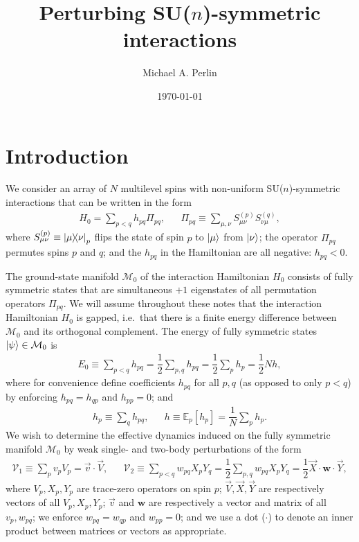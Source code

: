 \documentclass[nofootinbib,notitlepage,11pt]{revtex4-2}
\newcommand{\f}[2]{\dfrac{#1}{#2}} %
\renewcommand{\sp}[1]{\left[#1\right]} %
\renewcommand{\c}{\cdot} %
\newcommand{\m}{\bm} %
\renewcommand{\v}{\vec} %
\newcommand{\1}{\mathds{1}}
\newcommand{\M}{\mathcal{M}}
\newcommand{\V}{\mathcal{V}}
\newcommand{\EE}{\mathbb{E}}
\begin{document}
\title{Perturbing SU($n$)-symmetric interactions}%
\author{Michael A. Perlin}%
\date{\today}

\maketitle

\tableofcontents

\section{Introduction}

We consider an array of $N$ multilevel spins with non-uniform
SU($n$)-symmetric interactions that can be written in the form
\begin{align}
  H_0 = \sum_{p<q} h_{pq} \Pi_{pq},
  &&
  \Pi_{pq} \equiv \sum_{\mu,\nu} S_{\mu\nu}^{(p)} S_{\nu\mu}^{(q)},
  \label{eq:ints}
\end{align}
where $S_{\mu\nu}^{(p)}\equiv\op{\mu}{\nu}_p$ flips the state of spin
$p$ to $\ket\mu$ from $\ket\nu$; the operator $\Pi_{pq}$ permutes
spins $p$ and $q$; and the $h_{pq}$ in the Hamiltonian are all
negative: $h_{pq}<0$.

The ground-state manifold $\M_0$ of the interaction Hamiltonian $H_0$
consists of fully symmetric states that are simultaneous $+1$
eigenstates of all permutation operators $\Pi_{pq}$.  We will assume
throughout these notes that the interaction Hamiltonian $H_0$ is
gapped, i.e.~that there is a finite energy difference between $\M_0$
and its orthogonal complement.  The energy of fully symmetric states
$\ket\psi\in\M_0$ is
\begin{align}
  E_0 \equiv \sum_{p<q} h_{pq}
  = \f12 \sum_{p,q} h_{pq}
  = \f12 \sum_p h_p
  = \f12 N h,
\end{align}
where for convenience define coefficients $h_{pq}$ for all $p,q$ (as
opposed to only $p<q$) by enforcing $h_{pq}=h_{qp}$ and $h_{pp}=0$;
and
\begin{align}
  h_p \equiv \sum_q h_{pq},
  &&
  h \equiv \EE_p\sp{h_p} = \f1N \sum_p h_p.
\end{align}
We wish to determine the effective dynamics induced on the fully
symmetric manifold $\M_0$ by weak single- and two-body perturbations
of the form
\begin{align}
  \V_1 \equiv \sum_p v_p V_p = \v v\c\v V,
  &&
  \V_2 \equiv \sum_{p<q} w_{pq} X_p Y_q
  = \f12 \sum_{p,q} w_{pq} X_p Y_q
  = \f12 \v X \c\m w \c\v Y,
  \label{eq:perturbations}
\end{align}
where $V_p,X_p,Y_p$ are trace-zero operators on spin $p$;
$\v V,\v X,\v Y$ are respectively vectors of all $V_p,X_p,Y_p$; $\v v$
and $\m w$ are respectively a vector and matrix of all $v_p,w_{pq}$;
we enforce $w_{pq}=w_{qp}$ and $w_{pp}=0$; and we use a dot ($\c$) to
denote an inner product between matrices or vectors as appropriate.
\end{document}
